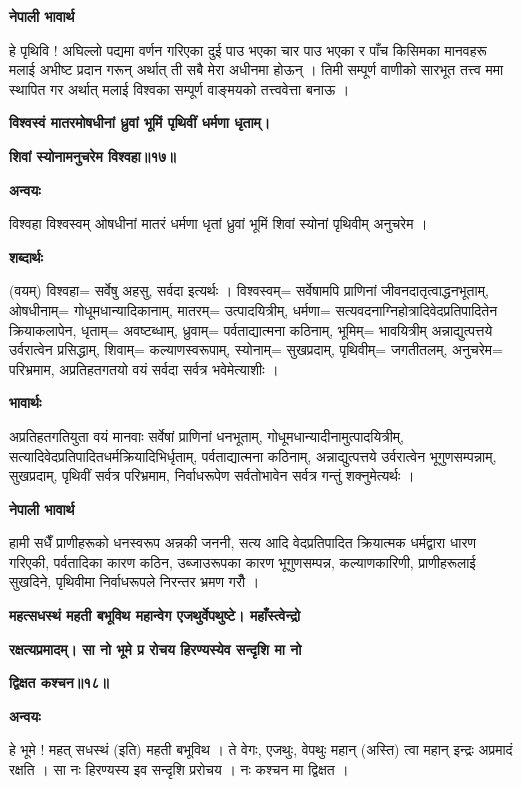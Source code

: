 \documentclass[11pt, a5paper]{article}
\begin{document}
\textbf{नेपाली भावार्थ}

हे पृथिवि ! अघिल्लो पद्यमा वर्णन गरिएका दुई पाउ भएका चार पाउ भएका र पाँच किसिमका मानवहरू मलाई अभीष्ट प्रदान गरून् अर्थात् ती सबै मेरा अधीनमा होऊन् । तिमी सम्पूर्ण वाणीको सारभूत तत्त्व ममा स्थापित गर अर्थात् मलाई विश्वका सम्पूर्ण वाङ्मयको तत्त्ववेत्ता बनाऊ ।

\textbf{विश्वस्वं मातरमोषधीनां ध्रुवां भूमिं पृथिवीं धर्मणा धृताम्।}

\textbf{शिवां स्योनामनुचरेम विश्वहा॥१७॥}

\textbf{अन्वयः}

विश्वहा विश्वस्वम् ‍ओषधीनां मातरं धर्मणा धृतां ध्रुवां भूमिं शिवां स्योनां पृथिवीम् अनुचरेम ।

\textbf{शब्दार्थः}

(वयम्) विश्वहा= सर्वेषु अहसु, सर्वदा इत्यर्थः । विश्वस्वम्= सर्वेषामपि प्राणिनां जीवनदातृत्वाद्धनभूताम्, ओषधीनाम्= गोधूमधान्यादिकानाम्, मातरम्= उत्पादयित्रीम्, धर्मणा= सत्यवदनाग्निहोत्रादिवेदप्रतिपादितेन क्रियाकलापेन, धृताम्= अवष्टब्धाम्, ध्रुवाम्= पर्वताद्यात्मना कठिनाम्, भूमिम्= भावयित्रीम् अन्नाद्युत्पत्तये उर्वरात्वेन प्रसिद्धाम्, शिवाम्= कल्याणस्वरूपाम्, स्योनाम्= सुखप्रदाम्, पृथिवीम्= जगतीतलम्, अनुचरेम= परिभ्रमाम, अप्रतिहतगतयो वयं सर्वदा सर्वत्र भवेमेत्याशीः ।

\textbf{भावार्थः}

अप्रतिहतगतियुता वयं मानवाः सर्वेषां प्राणिनां धनभूताम्, गोधूमधान्यादीनामुत्पादयित्रीम्, सत्यादिवेदप्रतिपादितधर्मक्रियादिभिर्धृताम्, पर्वताद्यात्मना कठिनाम्, अन्नाद्युत्पत्तये उर्वरात्वेन भूगुणसम्पन्नाम्, सुखप्रदाम्, पृथिवीं सर्वत्र परिभ्रमाम, निर्वाधरूपेण सर्वतोभावेन सर्वत्र गन्तुं शक्नुमेत्यर्थः ।

\textbf{नेपाली भावार्थ}

हामी सधैँ प्राणीहरूको धनस्वरूप अन्नकी जननी, सत्य आदि वेदप्रतिपादित क्रियात्मक धर्मद्वारा धारण गरिएकी, पर्वतादिका कारण कठिन, उब्जाउरूपका कारण भूगुणसम्पन्न, कल्याणकारिणी, प्राणीहरूलाई सुखदिने, पृथिवीमा निर्वाधरूपले निरन्तर भ्रमण गरौँ ।

\textbf{महत्सधस्थं महती बभूविथ महान्वेग एजथुर्वेपथुष्टे। महाँस्त्वेन्द्रो}

\textbf{रक्षत्यप्रमादम्। सा नो भूमे प्र रोचय हिरण्यस्येव सन्दृशि मा नो}

\textbf{द्विक्षत कश्चन॥१८॥}

\textbf{अन्वयः}

हे भूमे ! महत् सधस्थं (इति) महती बभूविथ । ते वेगः, एजथुः, वेपथुः महान् (अस्ति) त्वा महान् इन्द्रः अप्रमादं रक्षति । सा नः हिरण्यस्य इव सन्दृशि प्ररोचय । नः कश्चन मा द्विक्षत ।
\end{document}
